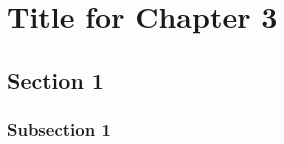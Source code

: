
\chapter{Title for Chapter 3}\label{chapters:chapter_3}
\vspace{-7mm}

\section{Section 1}\label{sec:ch_3_sec_1}

\subsection{Subsection 1}\label{subsec:subsec_3.1.1}


\clearpage

